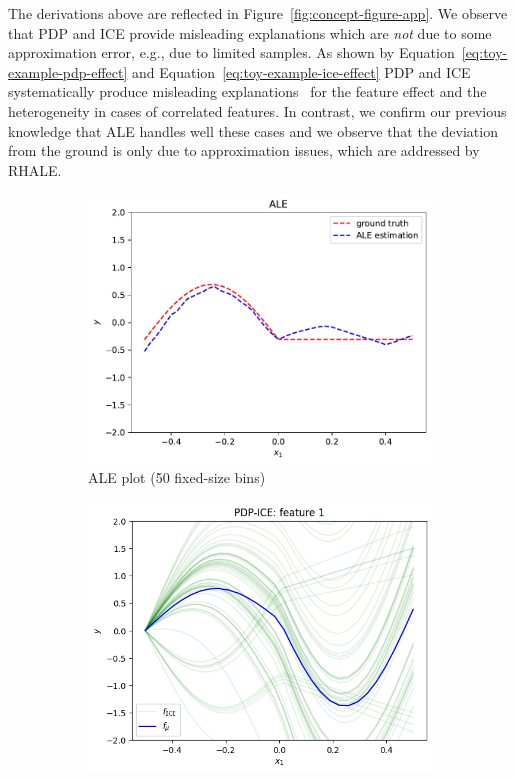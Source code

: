 \documentclass{article} %
\begin{document}
The derivations above are reflected in Figure~\ref{fig:concept-figure-app}.
We observe that PDP and ICE provide misleading explanations which are \emph{not} due
to some approximation error, e.g., due to limited samples.
As shown by Equation~\ref{eq:toy-example-pdp-effect} and Equation~\ref{eq:toy-example-ice-effect}
PDP and ICE systematically produce misleading explanations~\citep{apley2020visualizing} for the feature effect and the heterogeneity
in cases of correlated features.
In contrast, we confirm our previous knowledge that ALE handles well these cases and
we observe that the deviation from the ground is only due to approximation issues,
which are addressed by RHALE.

\begin{figure}
    \centering
\begin{subfigure}{.32\textwidth}
  \centering
  \includegraphics[width=1\textwidth]{concept_figure/exp_1_ale_50_bins_0}
  \caption{ALE plot (50 fixed-size bins)}
  \label{fig:concept-figure-subfig-1-app}
\end{subfigure}%
\begin{subfigure}{.32\textwidth}
  \centering
  \includegraphics[width=1\textwidth]{concept_figure/exp_1_pdp_ice_0}

\end{subfigure}
\end{figure}
\end{document}

